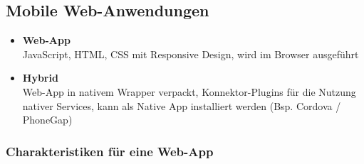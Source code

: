 \documentclass[a4paper]{article}
\begin{document}
	\subsection{Mobile Web-Anwendungen}
	
	\begin{itemize}
		
		\item \textbf{Web-App}\\
				JavaScript, HTML, CSS mit Responsive Design, wird im Browser ausgeführt
				
		\item \textbf{Hybrid}\\
		Web-App in nativem Wrapper verpackt, Konnektor-Plugins für die Nutzung nativer Services, kann als Native App installiert werden (Bsp. Cordova / PhoneGap)
	\end{itemize}


		\subsubsection{Charakteristiken für eine Web-App}
		
\end{document}
